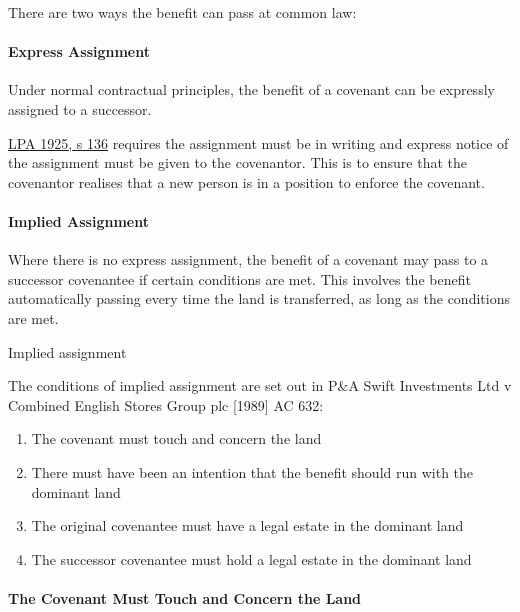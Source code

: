 \documentclass[
]{article}
\providecommand{\tightlist}{%
  \setlength{\itemsep}{0pt}\setlength{\parskip}{0pt}}
\newenvironment{env-40671eed-0836-415a-96f9-b6b8ee9a8b3f}
{
    \savenotes\tcolorbox[blanker,breakable,left=5pt,borderline west={2pt}{-4pt}{pink}]
}
{
    \endtcolorbox\spewnotes
}
\begin{document}
There are two ways the benefit can pass at common law:

\hypertarget{express-assignment}{%
\paragraph{Express Assignment}\label{express-assignment}}

Under normal contractual principles, the benefit of a covenant can be
expressly assigned to a successor.

\href{https://www.legislation.gov.uk/ukpga/Geo5/15-16/20/section/136}{LPA
1925, s 136} requires the assignment must be in writing and express
notice of the assignment must be given to the covenantor. This is to
ensure that the covenantor realises that a new person is in a position
to enforce the covenant.

\hypertarget{implied-assignment}{%
\paragraph{Implied Assignment}\label{implied-assignment}}

Where there is no express assignment, the benefit of a covenant may pass
to a successor covenantee if certain conditions are met. This involves
the benefit automatically passing every time the land is transferred, as
long as the conditions are met.

\begin{env-40671eed-0836-415a-96f9-b6b8ee9a8b3f}

Implied assignment

The conditions of implied assignment are set out in P\&A Swift
Investments Ltd v Combined English Stores Group plc {[}1989{]} AC 632:

\begin{enumerate}
\tightlist
\item
  The covenant must touch and concern the land
\item
  There must have been an intention that the benefit should run with the
  dominant land
\item
  The original covenantee must have a legal estate in the dominant land
\item
  The successor covenantee must hold a legal estate in the dominant land
\end{enumerate}

\end{env-40671eed-0836-415a-96f9-b6b8ee9a8b3f}

\hypertarget{the-covenant-must-touch-and-concern-the-land}{%
\paragraph{The Covenant Must Touch and Concern the
Land}\label{the-covenant-must-touch-and-concern-the-land}}
\end{document}
